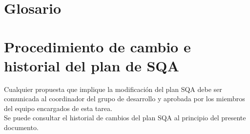 \documentclass[11pt, a4paper, twoside, titlepage]{article}
\begin{document}
	\section{Glosario}
		\printglossaries

	\section{Procedimiento de cambio e historial del plan de SQA} %
		Cualquier propuesta que implique la modificación del plan SQA debe ser comunicada al coordinador del grupo de desarrollo y aprobada por los miembros del equipo encargados de esta tarea.\\

		Se puede consultar el historial de cambios del plan SQA al principio del presente documento.

	\appendix
	\newpage
	
	
\end{document}
